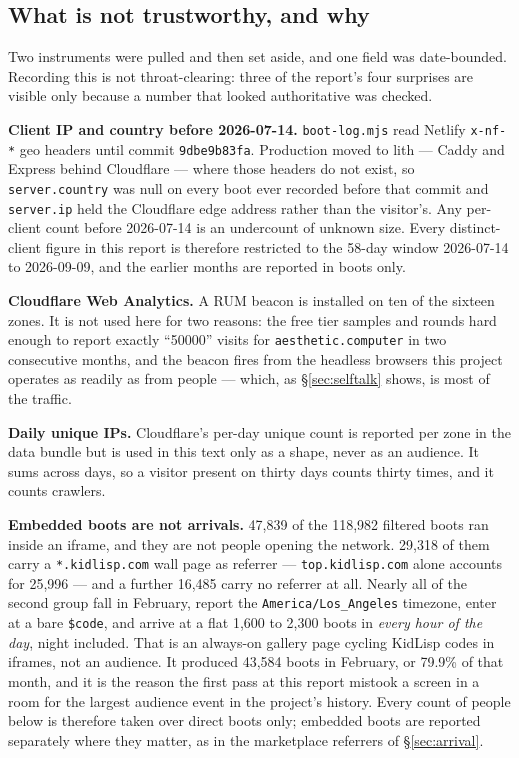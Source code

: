 \documentclass[10pt,letterpaper,twocolumn]{article}
\begin{document}
\subsection{What is not trustworthy, and why}

Two instruments were pulled and then set aside, and one field was
date-bounded. Recording this is not throat-clearing: three of the
report's four surprises are visible only because a number that looked
authoritative was checked.

\textbf{Client IP and country before 2026-07-14.} \texttt{boot-log.mjs}
read Netlify \texttt{x-nf-*} geo headers until commit
\texttt{9dbe9b83fa}. Production moved to lith --- Caddy and Express behind
Cloudflare --- where those headers do not exist, so \texttt{server.country}
was null on every boot ever recorded before that commit and
\texttt{server.ip} held the Cloudflare edge address rather than the
visitor's. Any per-client count before 2026-07-14 is an undercount of
unknown size. Every distinct-client figure in this report is therefore
restricted to the 58-day window 2026-07-14 to 2026-09-09, and the
earlier months are reported in boots only.

\textbf{Cloudflare Web Analytics.} A RUM beacon is installed on ten of
the sixteen zones. It is not used here for two reasons: the free tier
samples and rounds hard enough to report exactly ``50000'' visits for
\texttt{aesthetic.computer} in two consecutive months, and the beacon
fires from the headless browsers this project operates as readily as
from people --- which, as \S\ref{sec:selftalk} shows, is most of the
traffic.

\textbf{Daily unique IPs.} Cloudflare's per-day unique count is
reported per zone in the data bundle but is used in this text only as a
shape, never as an audience. It sums across days, so a visitor present
on thirty days counts thirty times, and it counts crawlers.

\label{sec:method-embed}
\textbf{Embedded boots are not arrivals.} 47,839 of the 118,982
filtered boots ran inside an iframe, and they are not people opening
the network. 29,318 of them carry a \texttt{*.kidlisp.com} wall page
as referrer --- \texttt{top.kidlisp.com} alone accounts for 25,996 ---
and a further 16,485 carry no referrer at all. Nearly all of the
second group fall in February, report the
\texttt{America/Los\_Angeles} timezone, enter at a bare
\texttt{\$code}, and arrive at a flat 1,600 to 2,300 boots in
\emph{every hour of the day}, night included. That is an always-on
gallery page cycling KidLisp codes in iframes, not an audience. It
produced 43,584 boots in February, or 79.9\% of that month, and it is
the reason the first pass at this report mistook a screen in a room for
the largest audience event in the project's history. Every count of
people below is therefore taken over direct boots only; embedded boots
are reported separately where they matter, as in the marketplace
referrers of \S\ref{sec:arrival}.
\end{document}

